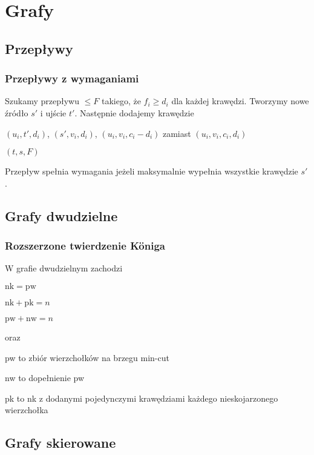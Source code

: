 \section{Grafy}

\subsection{Przepływy}

\subsubsection{Przepływy z wymaganiami}
Szukamy przepływu $\leq F$ takiego, że $f_i \geq d_i$ dla każdej krawędzi.
Tworzymy nowe źródło $s'$ i ujście $t'$.
Następnie dodajemy krawędzie
\begin{compactitem}
  \item $(u_i, t', d_i)$, $(s', v_i, d_i)$, $(u_i, v_i, c_i - d_i)$ zamiast $(u_i, v_i, c_i, d_i)$ 
  \item $(t, s, F)$
\end{compactitem}
Przepływ spełnia wymagania jeżeli maksymalnie wypełnia wszystkie krawędzie $s'$.

\subsection{Grafy dwudzielne}

\subsubsection{Rozszerzone twierdzenie K\"oniga}
W grafie dwudzielnym zachodzi
\begin{compactitem}
  \item $\mathrm{nk} = \mathrm{pw}$
  \item $\mathrm{nk} + \mathrm{pk} = n$
  \item $\mathrm{pw} + \mathrm{nw} = n$
\end{compactitem}
oraz
\begin{compactitem}
  \item pw to zbiór wierzchołków na brzegu min-cut
  \item nw to dopełnienie pw
  \item pk to nk z dodanymi pojedynczymi krawędziami każdego nieskojarzonego wierzchołka
\end{compactitem}

\subsection{Grafy skierowane}
